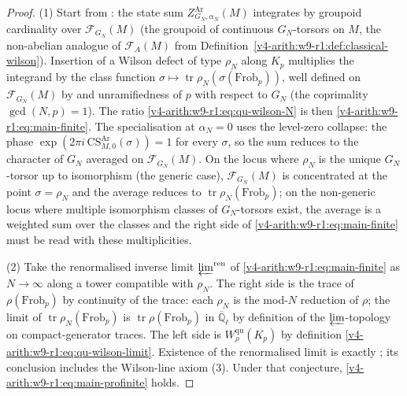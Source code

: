 \begin{proof}
(1) Start from
: the state sum
\(Z^{\mathrm{Ar}}_{G_{N},\alpha_{N}}(M)\) integrates by groupoid
cardinality over \(\mathcal F_{G_{N}}(M)\) (the groupoid of continuous
\(G_{N}\)-torsors on \(M\), the non-abelian analogue of
\(\mathcal F_{A}(M)\) from Definition~\ref{v4-arith:w9-r1:def:classical-wilson}). Insertion of a Wilson defect
of type \(\rho_{N}\) along \(K_{p}\) multiplies the integrand by the
class function
\(\sigma\mapsto\operatorname{tr}\rho_{N}(\sigma(\mathrm{Frob}_{p}))\),
well defined on \(\mathcal F_{G_{N}}(M)\) by
 and unramifiedness of
\(p\) with respect to \(G_{N}\) (the coprimality
\(\gcd(N,p)=1\)). The ratio
\eqref{v4-arith:w9-r1:eq:qu-wilson-N} is then
\eqref{v4-arith:w9-r1:eq:main-finite}. The specialisation at
\(\alpha_{N}=0\) uses the level-zero collapse: the phase
\(\exp(2\pi i\,\mathrm{CS}^{\mathrm{Ar}}_{M,0}(\sigma))=1\) for every
\(\sigma\), so the sum reduces to the character of \(G_{N}\) averaged on
\(\mathcal F_{G_{N}}(M)\).
On the locus where \(\rho_{N}\) is the unique \(G_{N}\)-torsor up to
isomorphism (the generic case),
\(\mathcal F_{G_{N}}(M)\) is concentrated at the point
\(\sigma=\rho_{N}\) and the average reduces to
\(\operatorname{tr}\rho_{N}(\mathrm{Frob}_{p})\); on the non-generic
locus where multiple isomorphism classes of \(G_{N}\)-torsors exist,
the average is a weighted sum over the classes and the right side of
\eqref{v4-arith:w9-r1:eq:main-finite} must be read with these
multiplicities.

(2) Take the renormalised inverse limit
\(\varprojlim^{\mathrm{ren}}\) of \eqref{v4-arith:w9-r1:eq:main-finite}
as \(N\to\infty\) along a tower compatible with \(\rho_{N}\). The
right side is the trace of \(\rho(\mathrm{Frob}_{p})\) by continuity of
the trace: each \(\rho_{N}\) is the mod-\(N\) reduction of \(\rho\); the
limit of \(\operatorname{tr}\rho_{N}(\mathrm{Frob}_{p})\) is
\(\operatorname{tr}\rho(\mathrm{Frob}_{p})\) in
\(\overline{\mathbb Q}_{\ell}\) by definition of the
\(\varprojlim\)-topology on compact-generator traces.
The left side is \(W^{\mathrm{qu}}_{\rho}(K_{p})\) by definition
\eqref{v4-arith:w9-r1:eq:qu-wilson-limit}. Existence of the
renormalised limit is exactly
; its conclusion includes the
Wilson-line axiom (3). Under that
conjecture,
\eqref{v4-arith:w9-r1:eq:main-profinite} holds.
\end{proof}

